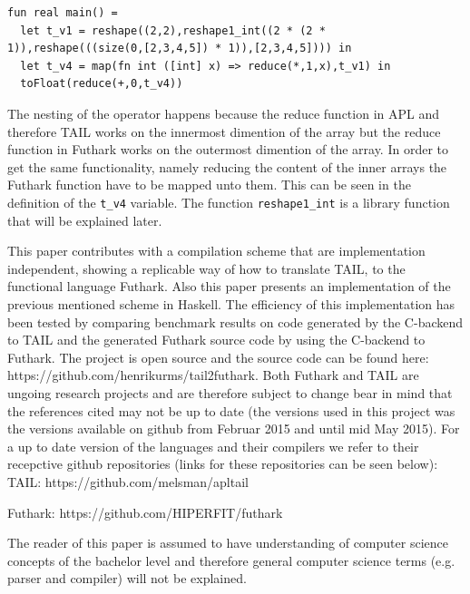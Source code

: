 \documentclass[11pt]{article}
\begin{document}
\begin{lstlisting}[numbers=none,frame=none,breaklines=true,language=Futhark]
fun real main() =
  let t_v1 = reshape((2,2),reshape1_int((2 * (2 * 1)),reshape(((size(0,[2,3,4,5]) * 1)),[2,3,4,5]))) in
  let t_v4 = map(fn int ([int] x) => reduce(*,1,x),t_v1) in
  toFloat(reduce(+,0,t_v4))
\end{lstlisting}

The nesting of the operator happens because the reduce function in APL and therefore TAIL works on the innermost dimention of the array but the reduce function in Futhark works on the outermost dimention of the array. In order to get the same functionality, namely reducing the content of the inner arrays the Futhark function have to be mapped unto them. This can be seen in the definition of the {\tt t\_v4} variable. 
The function {\tt reshape1\_int} is a library function that will be explained later. 

This paper contributes with a compilation scheme that are implementation independent, showing a replicable 
way of how to translate TAIL, to the functional language Futhark. Also 
this paper presents an implementation of the previous mentioned scheme in Haskell.
The efficiency of this implementation has been tested by comparing benchmark results on code generated by the C-backend to TAIL 
and the generated Futhark source code by using the C-backend to Futhark.
The project is open source and the source code can be found here:\\ https://github.com/henrikurms/tail2futhark.
Both Futhark and TAIL are ungoing research projects and are therefore subject to change bear in mind that the references cited may not be up to date (the versions used in this project was the versions available on github from Februar 2015 and until mid May 2015). For a up to date version of the languages and their compilers we refer to their recepctive github repositories (links for these repositories can be seen below): \\

TAIL: https://github.com/melsman/apltail

Futhark: https://github.com/HIPERFIT/futhark

The reader of this paper is assumed to have understanding of computer science concepts of the bachelor level and therefore general computer science terms (e.g. parser and compiler) will not be explained. 

\end{document}
